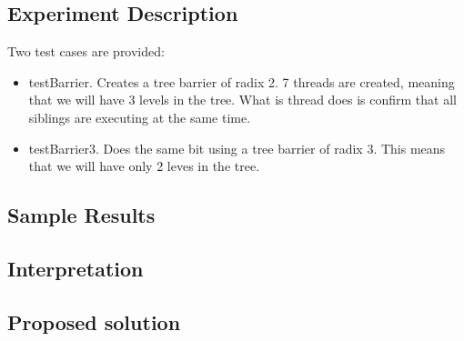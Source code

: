 \subsection{Experiment Description}
\par
Two test cases are provided:
\par
\begin{itemize}
\item testBarrier. Creates a tree barrier of radix 2. 7 threads are created,
meaning that we will have 3 levels in the tree. What is thread does is confirm
that all siblings are executing at the same time. 
\item testBarrier3. Does the same bit using a tree barrier of radix 3. This
means that we will have only 2 leves in the tree.
\end{itemize}
\par
\subsection{Sample Results}
\par
\par
\subsection{Interpretation}
\par
\par
\subsection{Proposed solution}
\par
\par

